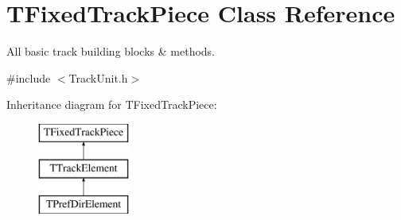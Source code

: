 \hypertarget{class_t_fixed_track_piece}{}\section{T\+Fixed\+Track\+Piece Class Reference}
\label{class_t_fixed_track_piece}


All basic track building blocks \& methods.  




{\ttfamily \#include $<$Track\+Unit.\+h$>$}

Inheritance diagram for T\+Fixed\+Track\+Piece\+:\begin{figure}[H]
\begin{center}
\leavevmode
\includegraphics[height=3.000000cm]{class_t_fixed_track_piece}
\end{center}
\end{figure}
